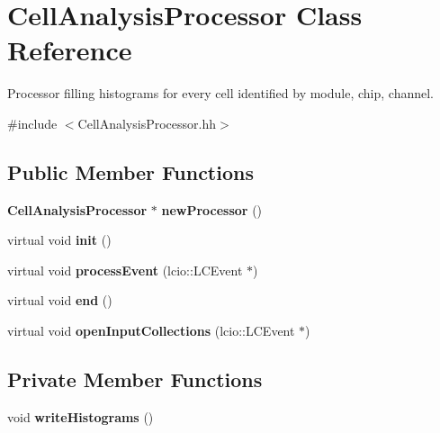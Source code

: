 \section{CellAnalysisProcessor Class Reference}
\label{classCellAnalysisProcessor}


Processor filling histograms for every cell identified by module, chip, channel.  


{\ttfamily \#include $<$CellAnalysisProcessor.hh$>$}\subsection*{Public Member Functions}
\begin{DoxyCompactItemize}
\item 
{\bf CellAnalysisProcessor} $\ast$ {\bfseries newProcessor} ()\label{classCellAnalysisProcessor_a06ea545c77c9679962952e4ecc85036e}

\item 
virtual void {\bfseries init} ()\label{classCellAnalysisProcessor_a1b00ce42ce45eba2ec8837e56387fde1}

\item 
virtual void {\bfseries processEvent} (lcio::LCEvent $\ast$)\label{classCellAnalysisProcessor_a331ece10359e29da6318bd9dc52e9d14}

\item 
virtual void {\bfseries end} ()\label{classCellAnalysisProcessor_a0cdbbf21c86f123832b12bf55f0c89cd}

\item 
virtual void {\bfseries openInputCollections} (lcio::LCEvent $\ast$)\label{classCellAnalysisProcessor_a2075341b4d90ce2d23f547c10b920702}

\end{DoxyCompactItemize}
\subsection*{Private Member Functions}
\begin{DoxyCompactItemize}
\item 
void {\bfseries writeHistograms} ()\label{classCellAnalysisProcessor_a25f161fbb939b83c8b6d257716cffe03}

\end{DoxyCompactItemize}
